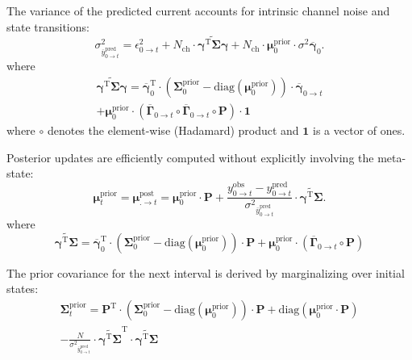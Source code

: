 \documentclass[pdflatex,sn-mathphys-num]{sn-jnl}%
\theoremstyle{thmstyleone}%
\theoremstyle{thmstyletwo}%
\theoremstyle{thmstylethree}%
\begin{document}
The variance of the predicted current accounts for intrinsic channel noise and state transitions:
\begin{equation}
	\sigma^2_{\overline{y}^{\text{pred}}_{0 \rightarrow t}} = \epsilon^2_{0 \rightarrow t} + N_{\text{ch}} \cdot \widetilde{\mathbf{\gamma}^{\mathrm{T}} \mathbf{\Sigma}\mathbf{\gamma}} + 
	N_{\text{ch}} \cdot \mathbf{\mu}^{\mathrm{prior}}_{0} \cdot {\sigma^2 \overline{\mathbf{\gamma}}}_{0}.
	\label{eq:macro_interval_sigma_pred}
\end{equation}
where
\begin{multline}
	\widetilde{\mathbf{\gamma}^{\mathrm{T}} \mathbf{\Sigma}\mathbf{\gamma}}= 
	\overline{\mathbf{\gamma}}_{0}^{\mathrm{T}} \cdot 
	\left( \mathbf{\Sigma}^{\mathrm{prior}}_{0} - \mathrm{diag}(\mathbf{\mu}^{\mathrm{prior}}_0) \right) \cdot 
	\overline{\mathbf{\gamma}}_{0 \rightarrow t} \\
	+ \mathbf{\mu}^{\mathrm{prior}}_0 \cdot \left( \overline{\mathbf{\Gamma}}_{0 \rightarrow t} \circ \overline{\mathbf{\Gamma}}_{0 \rightarrow t} \circ \mathbf{P} \right) \cdot \mathbf{1}
	\label{eq:simplified_meta_state}
\end{multline}
where \( \circ \) denotes the element-wise (Hadamard) product and \( \mathbf{1} \) is a vector of ones.

Posterior updates are efficiently computed without explicitly involving the meta-state:
\begin{equation}
	\boldsymbol{\mu}^{\mathrm{prior}}_{t} = \boldsymbol{\mu}^{\mathrm{post}}_{. \rightarrow t} = \boldsymbol{\mu}^{\mathrm{prior}}_0 \cdot \boldsymbol{P} + 
	\frac{y^{\mathrm{obs}}_{0 \rightarrow t} - y^{\mathrm{pred}}_{0 \rightarrow t}}{{\sigma^2}_{\overline{y}^{\mathrm{pred}}_{0 \rightarrow t}}} 
	\cdot \widetilde{\boldsymbol{\gamma}^{\mathrm{T}} \boldsymbol{\Sigma}}.
	\label{eq:macro_interval_posterior_mean}
\end{equation}
where
\begin{equation}
	\widetilde{\boldsymbol{\gamma}^{\mathrm{T}} \boldsymbol{\Sigma}}= \overline{\boldsymbol{\gamma}}_{0}^{\mathrm{T}} \cdot 
	\left( \boldsymbol{\Sigma}^{\mathrm{prior}}_{0} - \mathrm{diag}(\boldsymbol{\mu}^{\mathrm{prior}}_0) \right) \cdot \boldsymbol{P} 
	+ \boldsymbol{\mu}^{\mathrm{prior}}_0 \cdot \left( \overline{\boldsymbol{\Gamma}}_{0 \rightarrow t} \circ \boldsymbol{P} \right)
	\label{eq:interval_gamma_sigma}
\end{equation}

The prior covariance for the next interval is derived by marginalizing over initial states:
\begin{multline}
	\boldsymbol{\Sigma}^{\mathrm{prior}}_{t} = 
	\boldsymbol{P}^{\mathrm{T}} \cdot \left( \boldsymbol{\Sigma}^{\mathrm{prior}}_{0} - \mathrm{diag}(\boldsymbol{\mu}^{\mathrm{prior}}_{0}) \right) \cdot \boldsymbol{P}
	+ \mathrm{diag}(\boldsymbol{\mu}^{\mathrm{prior}}_{0} \cdot \boldsymbol{P}) \\
	- \frac{N}{{\sigma^2}_{\overline{y}^{\mathrm{pred}}_{0 \rightarrow t}}} \cdot
	\widetilde{\boldsymbol{\gamma}^{\mathrm{T}} \boldsymbol{\Sigma}}^{\mathrm{T}} \cdot \widetilde{\boldsymbol{\gamma}^{\mathrm{T}} \boldsymbol{\Sigma}}
	\label{eq:prior_covariance_update_0_t}
\end{multline}
\end{document}

